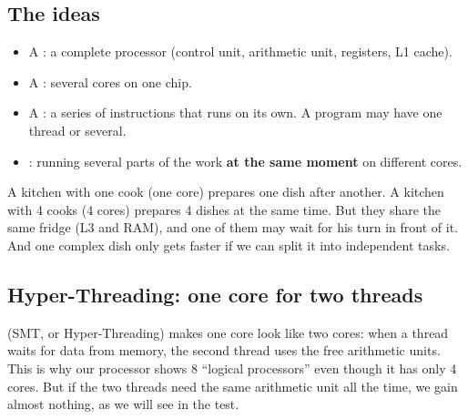\subsection{The ideas}
\begin{tarif}
    \begin{itemize}
        \item A : a complete processor (control unit, arithmetic unit, registers, L1 cache).
        \item A : several cores on one chip.
        \item A : a series of instructions that runs on its own. A program may have one thread or several.
        \item {}: running several parts of the work \textbf{at the same moment} on different cores.
    \end{itemize}
\end{tarif}

\begin{center}
\end{center}

\begin{tashbih}
    A kitchen with one cook (one core) prepares one dish after another. A kitchen with 4 cooks (4 cores) prepares 4 dishes
    at the same time. But they share the same fridge (L3 and RAM), and one of them may wait for his turn in front of it.
    And one complex dish only gets faster if we can split it into independent tasks.
\end{tashbih}

\subsection{Hyper-Threading: one core for two threads}
 (SMT, or Hyper-Threading) makes one core look like two cores:
when a thread waits for data from memory, the second thread uses the free arithmetic units. This is why our processor shows
8 ``logical processors'' even though it has only 4 cores. But if the two threads need the same arithmetic unit all the time,
we gain almost nothing, as we will see in the test.

